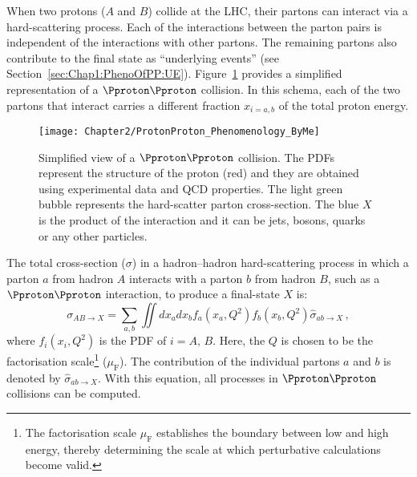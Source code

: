 
When two protons ($A$ and $B$) collide at the LHC, their partons can interact via a 
hard-scattering process. Each of the interactions between the parton pairs is independent 
of the interactions with other partons. The remaining partons also contribute 
to the final state as ``underlying events'' (see Section~\ref{sec:Chap1:PhenoOfPP:UE}).  
Figure~\ref{fig:Chap2:ProtonProton_Collision} provides a simplified representation of a $\Pproton \Pproton$ collision.
In this schema, each of the two partons that interact carries a different fraction $x_{i=a,b}$ of the
total proton energy.

\begin{figure}[h]
 	  \centering
	\texttt{[image: Chapter2/ProtonProton\_Phenomenology\_ByMe]}
	\caption{Simplified view of a $\Pproton \Pproton$ collision.
		The PDFs represent the structure of the proton (red) and they are obtained using experimental 
		data and QCD properties. The light green bubble represents the hard-scatter parton cross-section. 
		The blue $X$ is the product of the interaction and it can be jets, bosons, quarks or any other particles.} 
	\label{fig:Chap2:ProtonProton_Collision}
\end{figure}


The total cross-section ($\sigma$) in a hadron--hadron hard-scattering process in which 
a parton $a$ from hadron $A$ interacts with a parton $b$ from 
hadron $B$, such as a $\Pproton \Pproton$ interaction, to produce a final-state $X$ is:
\begin{equation*} %
	\sigma_{AB \rightarrow X} = \sum_{a, b} \iint dx_{a} dx_{b} f_{a}(x_{a}, Q^{2})  f_{b}(x_{b}, Q^{2}) \hat{\sigma}_{ab\rightarrow X}\, ,
\end{equation*}
where $f_{i}(x_{i}, Q^{2})$ is the PDF of $i = A,\, B$.
Here, the $Q$ is chosen to be the factorisation scale\footnote{The 
factorisation scale $\mu_{\text{F}}$ establishes the boundary between low and high energy,
thereby determining the scale at which perturbative calculations become valid.} ($\mu_{\text{F}}$).
The contribution of the individual partons $a$ and $b$ is denoted by  $\hat{\sigma}_{ab\rightarrow X}$.  
With this equation, all processes in $\Pproton \Pproton$ collisions can be computed. 

